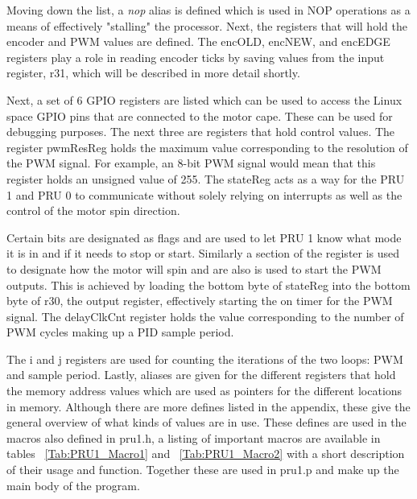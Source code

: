 \documentclass[12pt,oneside,final]{siuethesis}
\theoremstyle{definition}
\begin{document}
Moving down the list, a \emph{nop} alias is defined which is used in NOP operations as a means of effectively "stalling" the processor. Next, the registers that will hold the encoder and PWM values are defined.  The encOLD, encNEW, and encEDGE registers play a role in reading encoder ticks by saving values from the input register, r31, which will be described in more detail shortly. 

Next, a set of 6 GPIO registers are listed which can be used to access the Linux space GPIO pins that are connected to the motor cape. These can be used for debugging purposes. The next three are registers that hold control values. The register pwmResReg holds the maximum value corresponding to the resolution of the PWM signal. For example, an 8-bit PWM signal would mean that this register holds an unsigned value of 255. The stateReg acts as a way for the PRU 1 and PRU 0 to communicate without solely relying on interrupts as well as the control of the motor spin direction. 

Certain bits are designated as flags and are used to let PRU 1 know what mode it is in and if it needs to stop or start. Similarly a section of the register is used to designate how the motor will spin and are also is used to start the PWM outputs. This is achieved by loading the bottom byte of stateReg into the bottom byte of r30, the output register, effectively starting the on timer for the PWM signal. The delayClkCnt register holds the value corresponding to the number of PWM cycles making up a PID sample period. 

The i and j registers are used for counting the iterations of the two loops: PWM and sample period. Lastly, aliases are given for the different registers that hold the memory address values which are used as pointers for the different locations in memory. Although there are more defines listed in the appendix, these give the general overview of what kinds of values are in use. These defines are used in the macros also defined in pru1.h, a listing of important macros are available in tables ~\ref{Tab:PRU1_Macro1} and ~\ref{Tab:PRU1_Macro2} with a short description of their usage and function. Together these are used in pru1.p and make up the main body of the program.
\end{document}
